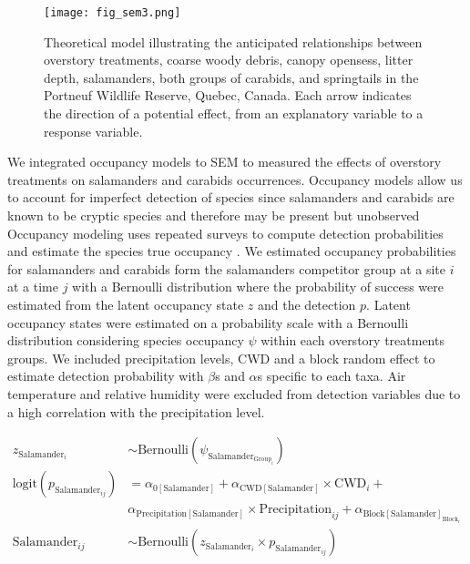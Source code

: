 \begin{figure}[ht!]
	\centering
	\texttt{[image: fig\_sem3.png]}
	\caption[Theoretical model illustrating the anticipated relationships between overstory treatments, environmental variables and species groups.]
  {Theoretical model illustrating the anticipated relationships between overstory treatments, coarse woody debris, canopy opensess, litter depth,
   salamanders, both groups of carabids, and springtails in the Portneuf Wildlife Reserve, Quebec, Canada. Each arrow indicates the direction of a potential effect, from an explanatory variable to a response variable.}
	\label{fig:SEM}
	\end{figure}  

\vspace{0.5cm}
  
We integrated occupancy models to SEM to measured the effects of overstory treatments on salamanders and carabids occurrences. 
Occupancy models allow us to account for imperfect detection of species since salamanders and carabids are known to be cryptic species and therefore may be present but unobserved \citep{baileyEstimatingSiteOccupancy2004,spiersEstimatingSpeciesMisclassification2022}
Occupancy modeling uses repeated surveys to compute detection probabilities and estimate the species true occupancy \citep{mackenzieEstimatingSiteOccupancy2002,mazerolleMakingGreatLeaps2007}.
We estimated occupancy probabilities for salamanders and carabids form the salamanders competitor group at a site $i$ at a time $j$ with a Bernoulli distribution where the probability of success were estimated from the latent occupancy state $z$ and the detection $p$.
Latent occupancy states were estimated on a probability scale with a Bernoulli distribution considering species occupancy $\psi$ within each overstory treatments groups.
We included precipitation levels, CWD and a block random effect to estimate detection probability with $\beta$s and $\alpha$s specific to each taxa.
Air temperature and relative humidity were excluded from detection variables due to a high correlation with the precipitation level.

\begin{align}
z_{\text{Salamander}_i} &\sim 
\text{Bernoulli}(\psi_{\text{Salamander}_{\text{Group}_i}}) \nonumber \\
\text{logit}(p_{\text{Salamander}_{ij}}) &= 
\alpha_{0[\text{Salamander}]} + \alpha_{\text{CWD}[\text{Salamander}]} \times \text{CWD}_i + \\
&\alpha_{\text{Precipitation}[\text{Salamander}]} \times \text{Precipitation}_{ij} + \alpha_{\text{Block}[\text{Salamander}]_{\text{Block}_i}} \nonumber \\
\text{Salamander}_{ij} &\sim 
\text{Bernoulli}(z_{\text{Salamander}_i} \times p_{\text{Salamander}_{ij}}) \nonumber
\end{align} 

